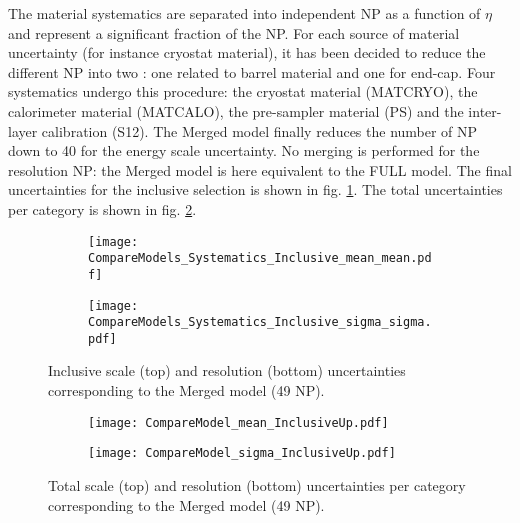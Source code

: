 \begin{enumerate}
The material systematics are separated into independent NP as a function of $\eta$ and represent a significant fraction of the NP.
For each source of material uncertainty (for instance cryostat material), it has been decided to reduce the different NP into two : one related to barrel material and one for end-cap.
Four systematics undergo this procedure: the cryostat material (MATCRYO), the calorimeter material (MATCALO), the pre-sampler material (PS) and the inter-layer calibration (S12).
The Merged model finally reduces the number of NP down to 40 for the energy scale uncertainty.
No merging is performed for the resolution NP: the Merged model is here equivalent to the FULL model.
The final uncertainties for the inclusive selection is shown in fig. \ref{org42d9a0c}.
The total uncertainties per category is shown in fig. \ref{org0ea9f20}.


\begin{figure}
\begin{subfigure}[t]{\linewidth}
\begin{center}
\texttt{[image: CompareModels\_Systematics\_Inclusive\_mean\_mean.pdf]}
\end{center}
\end{subfigure}
\begin{subfigure}[t]{\linewidth}
\begin{center}
\texttt{[image: CompareModels\_Systematics\_Inclusive\_sigma\_sigma.pdf]}
\end{center}
\end{subfigure}
\caption{\label{org42d9a0c}
Inclusive scale (top) and resolution (bottom) uncertainties corresponding to the Merged model (49 NP).}
\end{figure}


\begin{figure}
\begin{subfigure}[t]{\linewidth}
\begin{center}
\texttt{[image: CompareModel\_mean\_InclusiveUp.pdf]}
\end{center}
\end{subfigure}
\begin{subfigure}[t]{\linewidth}
\begin{center}
\texttt{[image: CompareModel\_sigma\_InclusiveUp.pdf]}
\end{center}
\end{subfigure}
\caption{\label{org0ea9f20}
Total scale (top) and resolution (bottom) uncertainties per category corresponding to the Merged model (49 NP).}
\end{figure}




\end{enumerate}
